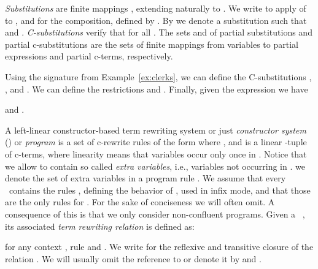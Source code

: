 {\em Substitutions}  are finite mappings , extending naturally to .   
We write  to apply of  to , and 
for the composition, defined by . 
By  we denote a substitution  such that  and .  
\emph{C-substitutions}
 verify that  for all .  The sets  and  of partial substitutions and partial c-substitutions are the sets of finite mappings from variables to partial expressions and partial c-terms, respectively. 


\begin{example}
Using the signature from Example~\ref{ex:clerks}, we can define the C-substitutions
, ,
and . We can define the restrictions 
 and
.
Finally, given the expression  we have

and
.
\end{example}

A {left-linear constructor-based term rewriting system} or just \emph{constructor system} (\emph{\ctrs}) or \emph{program}  is a set of c-rewrite rules of the form  where ,  and  is a linear -tuple of c-terms, where linearity means that variables occur only once in . Notice that we allow  to contain so called \emph{extra variables}, i.e., variables not occurring in . 
   we denote
the set of extra variables in a program rule . 
We assume that every \ctrs\ contains the rules , defining the behavior of , used in infix mode, and that those are the only rules for .  For the sake of conciseness we will often omit.  A consequence of this is that we only consider non-confluent programs. Given a \trs\ , its associated \emph{term rewriting relation}  is defined as:

for any context , rule  and . We write  for the reflexive and
transitive closure of the relation . We will usually omit the reference to  or denote it by  and .  

